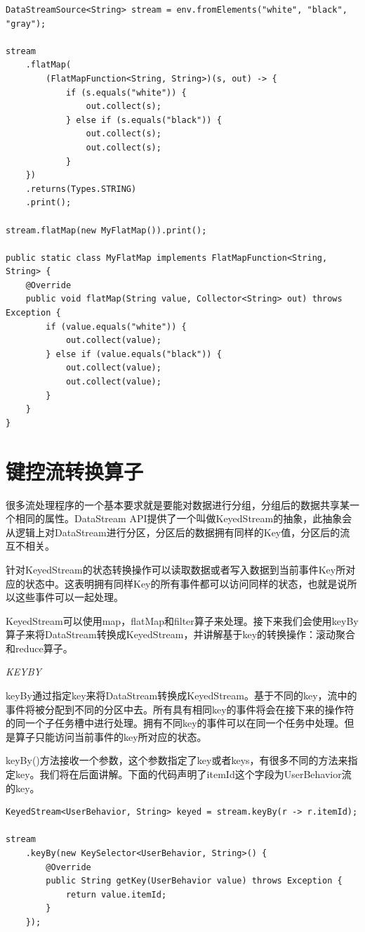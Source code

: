 \documentclass[cn,11pt,chinese]{elegantbook}
\begin{document}
\begin{verbatim}
DataStreamSource<String> stream = env.fromElements("white", "black", "gray");

stream
    .flatMap(
        (FlatMapFunction<String, String>)(s, out) -> {
            if (s.equals("white")) {
                out.collect(s);
            } else if (s.equals("black")) {
                out.collect(s);
                out.collect(s);
            }
    })
    .returns(Types.STRING)
    .print();
    
stream.flatMap(new MyFlatMap()).print();

public static class MyFlatMap implements FlatMapFunction<String, String> {
    @Override
    public void flatMap(String value, Collector<String> out) throws Exception {
        if (value.equals("white")) {
            out.collect(value);
        } else if (value.equals("black")) {
            out.collect(value);
            out.collect(value);
        }
    }
}
\end{verbatim}

\section{键控流转换算子}

很多流处理程序的一个基本要求就是要能对数据进行分组，分组后的数据共享某一个相同的属性。DataStream API提供了一个叫做KeyedStream的抽象，此抽象会从逻辑上对DataStream进行分区，分区后的数据拥有同样的Key值，分区后的流互不相关。

针对KeyedStream的状态转换操作可以读取数据或者写入数据到当前事件Key所对应的状态中。这表明拥有同样Key的所有事件都可以访问同样的状态，也就是说所以这些事件可以一起处理。

KeyedStream可以使用map，flatMap和filter算子来处理。接下来我们会使用keyBy算子来将DataStream转换成KeyedStream，并讲解基于key的转换操作：滚动聚合和reduce算子。

\textit{KEYBY}

keyBy通过指定key来将DataStream转换成KeyedStream。基于不同的key，流中的事件将被分配到不同的分区中去。所有具有相同key的事件将会在接下来的操作符的同一个子任务槽中进行处理。拥有不同key的事件可以在同一个任务中处理。但是算子只能访问当前事件的key所对应的状态。

keyBy()方法接收一个参数，这个参数指定了key或者keys，有很多不同的方法来指定key。我们将在后面讲解。下面的代码声明了itemId这个字段为UserBehavior流的key。

\begin{verbatim}
KeyedStream<UserBehavior, String> keyed = stream.keyBy(r -> r.itemId);

stream
    .keyBy(new KeySelector<UserBehavior, String>() {
        @Override
        public String getKey(UserBehavior value) throws Exception {
            return value.itemId;
        }
    });
\end{verbatim}
\end{document}

